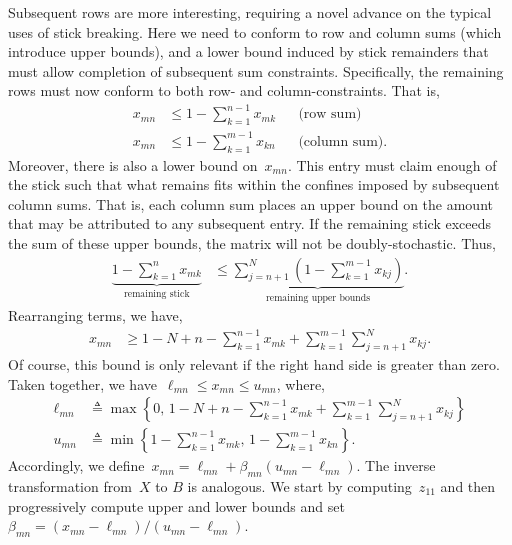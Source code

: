 \documentclass[twoside]{article}
\begin{document}
Subsequent rows are more interesting, requiring a novel advance on the
typical uses of stick breaking. Here we need to conform to row and
column sums (which introduce upper bounds), and a lower bound
induced by stick remainders that must allow completion of subsequent
sum constraints.  Specifically, the remaining rows must now conform to
both row- and column-constraints. That is,
\begin{align*}
x_{mn} &\leq 1- \sum_{k=1}^{n-1} x_{mk} & & \text{(row sum)} \\
x_{mn} &\leq 1- \sum_{k=1}^{m-1} x_{kn} & & \text{(column sum)}.
\end{align*}
Moreover, there is also a lower bound on~$x_{mn}$. This entry must
claim enough of the stick such that what remains fits within
the confines imposed by subsequent column sums. That is, each column
sum places an upper bound on the amount that may be attributed to any
subsequent entry. If the remaining stick exceeds the sum of these
upper bounds, the matrix will not be doubly-stochastic.  Thus,
\begin{align*}
\underbrace{1 - \sum_{k=1}^n x_{mk}}_{\text{remaining stick}}
  &\leq \underbrace{\sum_{j=n+1}^N (1- \sum_{k=1}^{m-1} x_{kj})}_{
    \text{remaining upper bounds}}.
\end{align*}
Rearranging terms, we have,
\begin{align*}
  x_{mn} &\geq
1 - N + n - \sum_{k=1}^{n-1} x_{mk}  +  \sum_{k=1}^{m-1} \sum_{j=n+1}^N x_{kj}.
\end{align*}
Of course, this bound is only relevant if the right hand side is
greater than zero.  Taken together, we
have~$\ell_{mn} \leq x_{mn} \leq u_{mn}$, where,
\begin{align*}
\ell_{mn} &\triangleq \max \left \{0, \, 1 - N + n - \sum_{k=1}^{n-1} x_{mk}  +  \sum_{k=1}^{m-1} \sum_{j=n+1}^N x_{kj} \right \}
\\
u_{mn} &\triangleq 
\min \left \{1- \sum_{k=1}^{n-1} x_{mk}, \,
1- \sum_{k=1}^{m-1} x_{kn} \right\}.
\end{align*}
Accordingly, we
define~${x_{mn} = \ell_{mn} + \beta_{mn} (u_{mn} - \ell_{mn})}$.  The
inverse transformation from~$X$ to $B$ is analogous.  We start by
computing~$z_{11}$ and then progressively compute upper and lower
bounds and
set~${\beta_{mn} = (x_{mn} - \ell_{mn})/(u_{mn} - \ell_{mn})}$.
\end{document}
